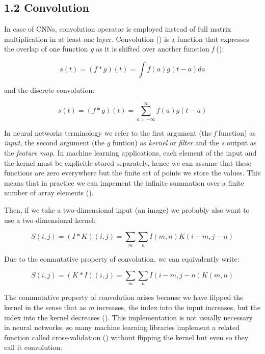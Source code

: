 \documentclass[12pt,a4paper,authoryear]{elsarticle}
\begin{document}
		\subsection*{1.2  Convolution}
		
		In case of CNNs, convolution operator is employed instead of full matrix multiplication in at least one layer. Convolution (\cite{bracewell1986fourier}) is a function that expresses the overlap of one function \textit{g} as it is shifted over another function \textit{f} (\cite{hirschman2012convolution}):
		
		\begin{equation}
		s(t) = (f*g)(t) = \int f(a)g(t-a)da 
		\end{equation}
		
		and the discrete convolution:
		
		\begin{equation}
		s(t) = (f*g)(t) = \sum_{a=-\infty}^{\infty} f(a)g(t-a)
		\end{equation}
		
		In neural networks terminology we refer to the first argument (the \textit{f} function) as \textit{input}, the second argument (the \textit{g} funtion) as \textit{kernel} or \textit{filter} and the \textit{s} output as the \textit{feature map}. In machine learning applications, each element of the input and the kernel must be explicitle stored separately, hence we can assume that these functions are zero everywhere but the finite set of points we store the values. This means that in practice we can impement the infinite summation over a finite number of array elements (\cite{goodfellow2016deep}). 
		
		Then, if we take a two-dimensional input (an image) we probably also want to use a two-dimensional kernel:
		
		\begin{equation}
		S(i,j) = (I*K)(i,j) = \sum_m\sum_nI(m,n)K(i-m,j-n)
		\end{equation}
		
		Due to the conmutative property of convolution, we can equivalently write:
		
		\begin{equation}
		S(i,j) = (K*I)(i,j) = \sum_m\sum_nI(i-m,j-n)K(m,n)
		\end{equation}
		
		The commutative property of convolution arises because we have filpped the kernel in the sense that as \textit{m} increases, the index into the input increases, but the index into the kernel decreases (\cite{goodfellow2016deep}). This implementation is not usually necessary in neural networks, so many machine learning libraries implement a related function called cross-validation (\cite{papoulis1962fourier}) without flipping the kernel but even so they call it convolution:
		
\end{document}
